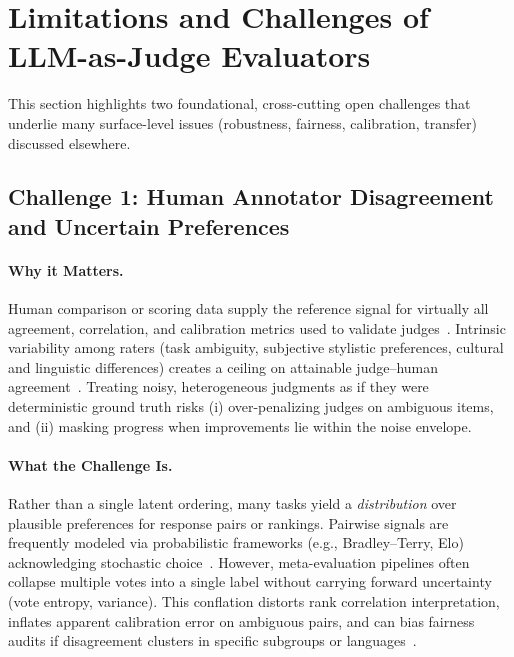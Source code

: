 
\section{Limitations and Challenges of LLM-as-Judge Evaluators}
This section highlights two foundational, cross-cutting open challenges that underlie many surface-level issues (robustness, fairness, calibration, transfer) discussed elsewhere.

\subsection{Challenge 1: Human Annotator Disagreement and Uncertain Preferences}
\paragraph{Why it Matters.} Human comparison or scoring data supply the reference signal for virtually all agreement, correlation, and calibration metrics used to validate judges~\cite{stiennon2020learning, ouyang2022training, bavaresco2024judgebench}. Intrinsic variability among raters (task ambiguity, subjective stylistic preferences, cultural and linguistic differences) creates a ceiling on attainable judge--human agreement~\cite{bavaresco2024judgebench, li2024_llmsasjudges}. Treating noisy, heterogeneous judgments as if they were deterministic ground truth risks (i) over-penalizing judges on ambiguous items, and (ii) masking progress when improvements lie within the noise envelope.
\paragraph{What the Challenge Is.} Rather than a single latent ordering, many tasks yield a \emph{distribution} over plausible preferences for response pairs or rankings. Pairwise signals are frequently modeled via probabilistic frameworks (e.g., Bradley--Terry, Elo) acknowledging stochastic choice~\cite{bradley1952rank, elo1978rating, liu2024pairs}. However, meta-evaluation pipelines often collapse multiple votes into a single label without carrying forward uncertainty (vote entropy, variance). This conflation distorts rank correlation interpretation, inflates apparent calibration error on ambiguous pairs, and can bias fairness audits if disagreement clusters in specific subgroups or languages~\cite{hada2024metal, liang2022helm}.
